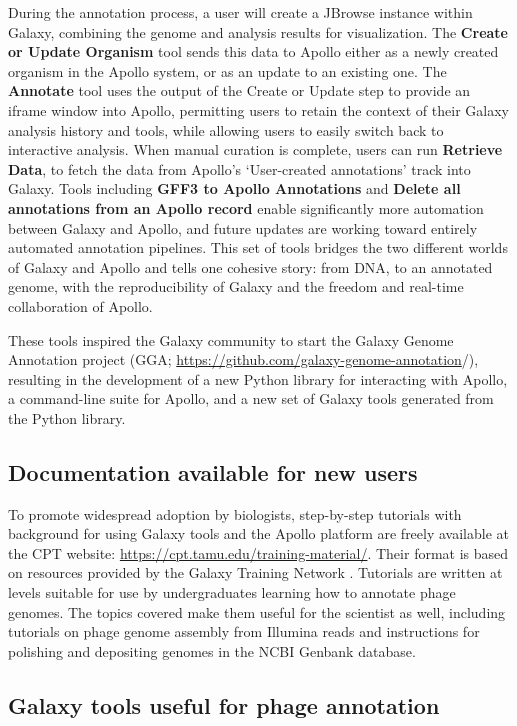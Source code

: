 During the annotation process, a user will create a JBrowse instance
within Galaxy, combining the genome and analysis results for
visualization. The \textbf{Create or Update Organism} tool sends this
data to Apollo either as a newly created organism in the Apollo system,
or as an update to an existing one. The \textbf{Annotate} tool uses the
output of the Create or Update step to provide an iframe window into
Apollo, permitting users to retain the context of their Galaxy analysis
history and tools, while allowing users to easily switch back to
interactive analysis. When manual curation is complete, users can run
\textbf{Retrieve Data}, to fetch the data from Apollo's `User-created
annotations' track into Galaxy. Tools including \textbf{GFF3 to Apollo
Annotations} and \textbf{Delete all annotations from an Apollo record}
enable significantly more automation between Galaxy and Apollo, and
future updates are working toward entirely automated annotation
pipelines. This set of tools bridges the two different worlds of Galaxy
and Apollo and tells one cohesive story: from DNA, to an annotated
genome, with the reproducibility of Galaxy and the freedom and real-time
collaboration of Apollo.

These tools inspired the Galaxy community to start the Galaxy Genome
Annotation project (GGA;
\url{https://github.com/galaxy-genome-annotation}/), resulting in the
development of a new Python library for interacting with Apollo, a
command-line suite for Apollo, and a new set of Galaxy tools generated
from the Python library.

\subsection*{Documentation available for new users}

To promote widespread adoption by biologists, step-by-step tutorials
with background for using Galaxy tools and the Apollo platform are
freely available at the CPT website:
\url{https://cpt.tamu.edu/training-material/}. Their format is based on
resources provided by the Galaxy Training Network \cite{Batut_2018}. Tutorials
are written at levels suitable for use by undergraduates learning how to
annotate phage genomes. The topics covered make them useful for the
scientist as well, including tutorials on phage genome assembly from
Illumina reads and instructions for polishing and depositing genomes in
the NCBI Genbank database.

\subsection*{Galaxy tools useful for phage annotation}

